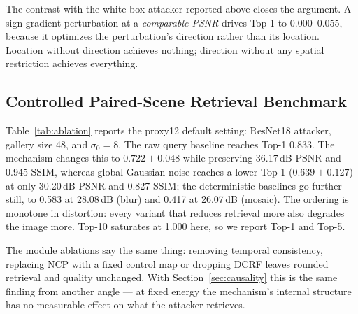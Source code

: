 \documentclass[10pt,journal]{IEEEtran}
\begin{document}
The contrast with the white-box attacker reported above closes the argument.
A sign-gradient perturbation at a \emph{comparable PSNR} drives Top-1 to
$0.000$--$0.055$, because it optimizes the perturbation's direction rather
than its location. Location without direction achieves nothing; direction without any spatial
restriction achieves everything.

\subsection{Controlled Paired-Scene Retrieval Benchmark}
Table~\ref{tab:ablation} reports the proxy12 default setting: ResNet18 attacker, gallery size 48, and $\sigma_0=8$. The raw query baseline reaches Top-1 0.833. The mechanism changes this to $0.722\pm0.048$ while preserving 36.17\,dB PSNR and 0.945 SSIM, whereas global Gaussian noise reaches a lower Top-1 ($0.639\pm0.127$) at only 30.20\,dB PSNR and 0.827 SSIM; the deterministic baselines go further still, to 0.583 at 28.08\,dB (blur) and 0.417 at 26.07\,dB (mosaic). The ordering is monotone in distortion: every variant that reduces retrieval
more also degrades the image more. Top-10 saturates at 1.000 here, so we
report Top-1 and Top-5.

The module ablations say the same thing: removing temporal consistency,
replacing NCP with a fixed control map or dropping DCRF leaves rounded
retrieval and quality unchanged. With Section~\ref{sec:causality} this is the
same finding from another angle --- at fixed energy the mechanism's internal
structure has no measurable effect on what the attacker retrieves.

\begin{table}[t]
\centering
\caption{Proxy12 paired-scene benchmark, default setting: ResNet18 attacker, gallery size 48, $\sigma_0=8$, 12 paired locations, and 36 hard distractors. Lower retrieval accuracy indicates stronger privacy. Stochastic variants report mean$\pm$std over three noise seeds; deterministic baselines are exact.}
\label{tab:ablation}
\end{table}
\end{document}
